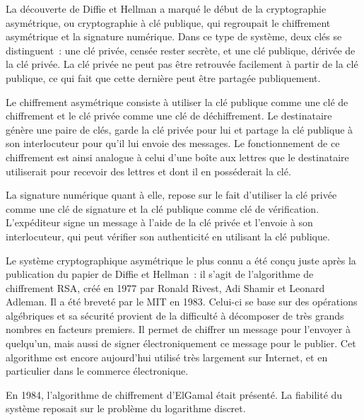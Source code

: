 La découverte de Diffie et Hellman a marqué le début de la cryptographie asymétrique, ou cryptographie à clé publique, qui regroupait le chiffrement asymétrique et la signature numérique. Dans ce type de système, deux clés se distinguent~: une clé privée, censée rester secrète, et une clé publique, dérivée de la clé privée. La clé privée ne peut pas être retrouvée facilement à partir de la clé publique, ce qui fait que cette dernière peut être partagée publiquement.

Le chiffrement asymétrique consiste à utiliser la clé publique comme une clé de chiffrement et le clé privée comme une clé de déchiffrement. Le destinataire génère une paire de clés, garde la clé privée pour lui et partage la clé publique à son interlocuteur pour qu'il lui envoie des messages. Le fonctionnement de ce chiffrement est ainsi analogue à celui d'une boîte aux lettres que le destinataire utiliserait pour recevoir des lettres et dont il en posséderait la clé.

La signature numérique quant à elle, repose sur le fait d'utiliser la clé privée comme une clé de signature et la clé publique comme clé de vérification. L'expéditeur signe un message à l'aide de la clé privée et l'envoie à son interlocuteur, qui peut vérifier son authenticité en utilisant la clé publique.

Le système cryptographique asymétrique le plus connu a été conçu juste après la publication du papier de Diffie et Hellman~: il s'agit de l'algorithme de chiffrement RSA, créé en 1977 par Ronald Rivest, Adi Shamir et Leonard Adleman. Il a été breveté par le MIT en 1983. Celui-ci se base sur des opérations algébriques et sa sécurité provient de la difficulté à décomposer de très grands nombres en facteurs premiers. Il permet de chiffrer un message pour l'envoyer à quelqu'un, mais aussi de signer électroniquement ce message pour le publier. Cet algorithme est encore aujourd'hui utilisé très largement sur Internet, et en particulier dans le commerce électronique.

En 1984, l'algorithme de chiffrement d'ElGamal était présenté. La fiabilité du système reposait sur le problème du logarithme discret.

